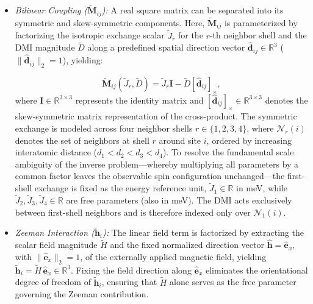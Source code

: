 \documentclass[a4paper,fleqn]{cas-sc}
\begin{document}
\begin{itemize}

    \item[--] \emph{Bilinear Coupling ($\tilde{\mathbf{M}}_{ij}$):} A 
    real square matrix can be separated into its symmetric and skew-symmetric components. Here, 
    $\tilde{\mathbf{M}}_{ij}$ is parameterized by factorizing the isotropic exchange scalar $\tilde{J}_r$ for the $r$-th neighbor shell and the DMI magnitude $\tilde{D}$ along a predefined spatial direction vector $\hat{\mathbf{d}}_{ij} \in \mathbb{R}^3$ 
    ($\|\hat{\mathbf{d}}_{ij}\|_2=1$), yielding:
    
    \begin{equation}\label{eq:MatrixDecomposition}
    \tilde{\mathbf{M}}_{ij}(\tilde{J}_r,\tilde{D}) = 
        \tilde{J}_r \mathbf{I} - \tilde{D} [\hat{\mathbf{d}}_{ij}]_{\times},
    \end{equation}
    where $\mathbf{I} \in \mathbb{R}^{3 \times 3}$ represents the identity matrix and 
    $[\hat{\mathbf{d}}_{ij}]_{\times} \in \mathbb{R}^{3 \times 3}$ denotes the skew-symmetric matrix representation of the cross-product. The symmetric exchange is modeled across four neighbor shells $r \in \{1,2,3,4\}$, where $\mathcal{N}_r(i)$ denotes the 
    set of neighbors at shell $r$ around site $i$, ordered by 
    increasing interatomic distance ($d_1 < d_2 < d_3 < d_4$). To resolve the fundamental scale ambiguity of the inverse problem---whereby multiplying all parameters by a common factor leaves the observable spin configuration unchanged---the first-shell exchange is fixed as the energy reference unit, $\tilde{J}_1\in \mathbb{R}$ in meV, while $\tilde{J}_2, \tilde{J}_3, \tilde{J}_4 \in \mathbb{R}$ are free parameters (also in meV). The DMI acts exclusively between first-shell neighbors and is therefore indexed only over $\mathcal{N}_1(i)$.

    \item[--] \emph{Zeeman Interaction ($\tilde{\mathbf{h}}_i$):} The linear field term is factorized by extracting the scalar field magnitude $\tilde{H}$ and the fixed normalized direction vector 
    $\hat{\mathbf{h}} = \hat{\mathbf{e}}_x,$ with 
    $\|\hat{\mathbf{e}}_x\|_2 = 1$, of the externally applied 
    magnetic field, yielding $\tilde{\mathbf{h}}_i = \tilde{H}\,\hat{\mathbf{e}}_x\in\mathbb{R}^3$. Fixing the field direction along $\hat{\mathbf{e}}_x$ eliminates the orientational degree of freedom of $\tilde{\mathbf{h}}_i$, ensuring that $\tilde{H}$ alone serves as the free parameter governing the Zeeman 
    contribution.


\end{itemize}
\end{document}
